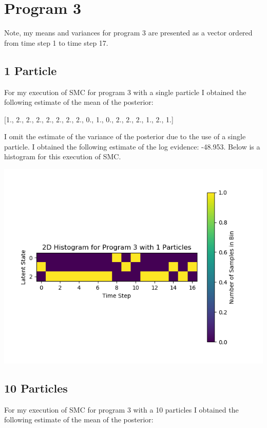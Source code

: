 \documentclass[11pt]{article}
\theoremstyle{definition}
\begin{document}
\section{Program 3}

Note, my means and variances for program 3 are presented as a vector ordered from time step 1 to time step 17.

\subsection{1 Particle}

For my execution of SMC for program 3 with a single particle I obtained the following estimate of the mean of the posterior:

[1., 2., 2., 2., 2., 2., 2., 2., 0., 1., 0., 2., 2., 2., 1., 2., 1.] 

I omit the estimate of the variance of the posterior due to the use of a single particle. I obtained the following estimate of the log evidence: -48.953. Below is a histogram for this execution of SMC.

\begin{center}
\includegraphics[scale=0.5]{../plots/P3NP1.png}
\end{center}

\subsection{10 Particles}


For my execution of SMC for program 3 with a 10 particles I obtained the following estimate of the mean of the posterior:
\end{document}
